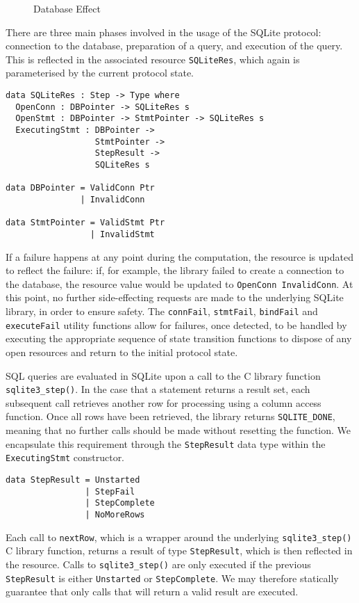 \begin{figure*}[t]
\begin{center}
\end{center}
\caption{Database Effect}
\label{fig:dbeffect}
\end{figure*}

There are three main phases involved in the usage of the SQLite protocol: connection to the database, preparation of a query, and execution of the query. This is reflected in the associated resource \texttt{SQLiteRes}, which again is parameterised by the current protocol state.
\begin{Verbatim}
data SQLiteRes : Step -> Type where
  OpenConn : DBPointer -> SQLiteRes s
  OpenStmt : DBPointer -> StmtPointer -> SQLiteRes s
  ExecutingStmt : DBPointer -> 
                  StmtPointer -> 
                  StepResult -> 
                  SQLiteRes s
                  
data DBPointer = ValidConn Ptr
               | InvalidConn

data StmtPointer = ValidStmt Ptr
                 | InvalidStmt 
\end{Verbatim}
If a failure happens at any point during the computation, the resource is updated to reflect the failure: if, for example, the library failed to create a connection to the database, the resource value would be updated to \texttt{OpenConn InvalidConn}. At this point, no further side-effecting requests are made to the underlying SQLite library, in order to ensure safety. The \texttt{connFail}, \texttt{stmtFail}, \texttt{bindFail} and \texttt{executeFail} utility functions allow for failures, once detected, to be handled by executing the appropriate sequence of state transition functions to dispose of any open resources and return to the initial protocol state. 

SQL queries are evaluated in SQLite upon a call to the C library function \texttt{sqlite3\_step()}. In the case that a statement returns a result set, each subsequent call retrieves another row for processing using a column access function. Once all rows have been retrieved, the library returns \texttt{SQLITE\_DONE}, meaning that no further calls should be made without resetting the function. We encapsulate this requirement through the \texttt{StepResult} data type within the \texttt{ExecutingStmt} constructor. 
\begin{Verbatim}
data StepResult = Unstarted
                | StepFail
                | StepComplete
                | NoMoreRows
\end{Verbatim}
Each call to \texttt{nextRow}, which is a wrapper around the underlying \texttt{sqlite3\_step()} C library function, returns a result of type \texttt{StepResult}, which is then reflected in the resource. Calls to \texttt{sqlite3\_step()} are only executed if the previous \texttt{StepResult} is either \texttt{Unstarted} or \texttt{StepComplete}. We may therefore statically guarantee that only calls that will return a valid result are executed. 


